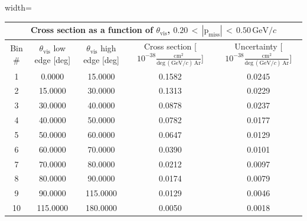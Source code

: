 \begin{table}[H]
\raggedright
\begin{adjustbox}{width=\textwidth}
\small
\begin{tabular}{ |c|c|c|c|c| }
\hline
\multicolumn{5}{|c|}{Cross section as a function of $\theta_{\mathrm{vis}}$, $\mathrm{0.20\,<\,|p_{miss}|\,<\,0.50\,GeV/\textit{c}}$} \\
\hline
\hline
Bin \# & $\theta_{\mathrm{vis}}$ low edge [deg] & $\theta_{\mathrm{vis}}$ high edge [deg] & Cross section [$10^{-38}\mathrm{\frac{cm^{2}}{deg\,(GeV/\textit{c})\,Ar}}$] & Uncertainty [$10^{-38}\mathrm{\frac{cm^{2}}{deg\,(GeV/\textit{c})\,Ar}}$] \\
\hline
\hline
1 & 0.0000 & 15.0000 & 0.1582 & 0.0245\\
2 & 15.0000 & 30.0000 & 0.1313 & 0.0229\\
3 & 30.0000 & 40.0000 & 0.0878 & 0.0237\\
4 & 40.0000 & 50.0000 & 0.0782 & 0.0177\\
5 & 50.0000 & 60.0000 & 0.0647 & 0.0129\\
6 & 60.0000 & 70.0000 & 0.0390 & 0.0101\\
7 & 70.0000 & 80.0000 & 0.0212 & 0.0097\\
8 & 80.0000 & 90.0000 & 0.0174 & 0.0079\\
9 & 90.0000 & 115.0000 & 0.0129 & 0.0046\\
10 & 115.0000 & 180.0000 & 0.0050 & 0.0018\\
\hline
\end{tabular}
\end{adjustbox}
\end{table}


